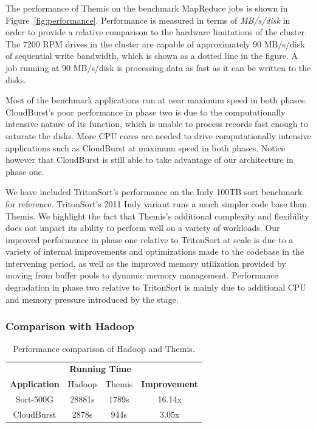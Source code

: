 The performance of Themis on the benchmark MapReduce jobs is shown in
Figure~\ref{fig:performance}. Performance is measured in terms of
\emph{MB/s/disk} in order to provide a relative comparison to the hardware
limitations of the cluster. The 7200 RPM drives in the cluster are capable of
approximately 90 MB/s/disk of sequential write bandwidth, which is shown as a
dotted line in the figure. A job running at 90 MB/s/disk is processing data as
fast as it can be written to the disks.

Most of the benchmark applications run at near maximum speed in both
phases. CloudBurst's poor performance in phase two is due to the
computationally intensive nature of its \reduce function, which is unable to
process records fast enough to saturate the disks. More CPU cores are needed to
drive computationally intensive applications such as CloudBurst at maximum
speed in both phases. Notice however that CloudBurst is still able to take
advantage of our architecture in phase one.

We have included TritonSort's performance on the Indy 100TB sort benchmark for
reference. TritonSort's 2011 Indy variant runs a much simpler code base than
Themis. We highlight the fact that Themis's additional complexity and
flexibility does not impact its ability to perform well on a variety of
workloads. Our improved performance in phase one relative to TritonSort at
scale is due to a variety of internal improvements and optimizations made to
the codebase in the intervening period, as well as the improved memory
utilization provided by moving from buffer pools to dynamic memory
management. Performance degradation in phase two relative to TritonSort is
mainly due to additional CPU and memory pressure introduced by the \Reducer
stage.

\subsubsection{Comparison with Hadoop}

\begin{table}
  \centering
  \caption{\label{table:hadoop} Performance comparison of Hadoop and Themis.}
  \begin{tabular}{|c|c|c|c|}
    \hline
     & \multicolumn{2}{|c|}{\textbf{Running Time}} &
     \\
    \cline{2-3}
    \textbf{Application} & Hadoop & Themis & \textbf{Improvement}\\
    \hline
    Sort-500G & 28881s & 1789s & 16.14x \\
    CloudBurst & 2878s & 944s & 3.05x \\
    \hline
  \end{tabular}
\end{table}

